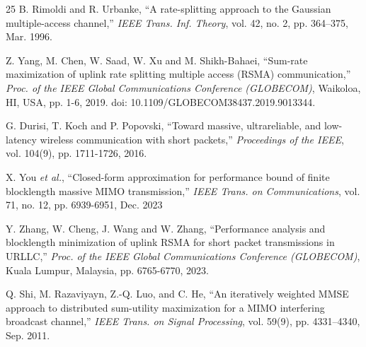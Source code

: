 \documentclass[a4paper, 12pt, onecolumn, journal, twoside, draftclsnofoot]{IEEEtran}
\begin{document}
\begin{thebibliography}{25} 
B. Rimoldi and R. Urbanke, ``A rate-splitting approach to the Gaussian multiple-access channel,'' \emph{IEEE Trans. Inf. Theory},  vol. 42, no. 2, pp. 364–375, Mar. 1996.

Z. Yang, M. Chen, W. Saad, W. Xu and M. Shikh-Bahaei, ``Sum-rate maximization of uplink rate splitting multiple access (RSMA) communication,'' \emph{Proc. of the IEEE Global Communications Conference (GLOBECOM)}, Waikoloa, HI, USA, pp. 1-6, 2019.  doi: 10.1109/GLOBECOM38437.2019.9013344.

G. Durisi, T. Koch and P. Popovski, ``Toward massive, ultrareliable, and low-latency wireless communication with short packets,'' \emph{Proceedings of the IEEE}, vol. 104(9), pp. 1711-1726, 2016.

X. You \emph{et al.}, ``Closed-form approximation for performance bound of finite blocklength massive MIMO transmission,'' \emph{IEEE Trans. on Communications}, vol. 71, no. 12, pp. 6939-6951, Dec. 2023

Y. Zhang, W. Cheng, J. Wang and W. Zhang, ``Performance analysis and blocklength minimization of uplink RSMA for short packet transmissions in URLLC,'' \emph{Proc. of the IEEE Global Communications Conference (GLOBECOM)}, Kuala Lumpur, Malaysia, pp. 6765-6770, 2023.

Q. Shi, M. Razaviyayn, Z.-Q. Luo, and C. He, ``An iteratively weighted MMSE approach to distributed sum-utility maximization for a MIMO interfering broadcast channel,'' \emph{IEEE Trans. on Signal Processing}, vol. 59(9), pp. 4331–4340, Sep. 2011.


\end{thebibliography}
\end{document}
